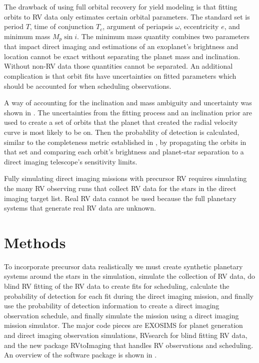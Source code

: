 The drawback of using full orbital recovery for yield modeling is that fitting
orbits to RV data only estimates certain orbital parameters. The standard set
is period $T$, time of conjunction $T_c$, argument of periapsis $\omega$,
eccentricity $e$, and minimum mass $M_p \sin{i}$. The minimum mass quantity
combines two parameters that impact direct imaging and estimations of an
exoplanet's brightness and location cannot be exact without separating the
planet mass and inclination. Without non-RV data those quantities cannot be
separated. An additional complication is that orbit fits have uncertainties on
fitted parameters which should be accounted for when scheduling observations.

A way of accounting for the inclination and mass ambiguity and uncertainty was
shown in . The uncertainties from the fitting
process and an inclination prior are used to create a set of orbits that the
planet that created the radial velocity curve is most likely to be on. Then the
probability of detection is calculated, similar to the completeness metric
established in \citet{Brown2005d}, by propagating the orbits in that set and
comparing each orbit's brightness and planet-star separation to a direct
imaging telescope's sensitivity limits.

Fully simulating direct imaging missions with precursor RV requires simulating
the many RV observing runs that collect RV data for the stars in the direct
imaging target list. Real RV data cannot be used because the full planetary
systems that generate real RV data are unknown.

\section{Methods}
To incorporate precursor data realistically we must create synthetic planetary
systems around the stars in the simulation, simulate the collection of RV data,
do blind RV fitting of the RV data to create fits for scheduling, calculate the
probability of detection for each fit during the direct imaging mission, and
finally use the probability of detection information to create a direct imaging
observation schedule, and finally simulate the mission using a direct imaging
mission simulator. The major code pieces are EXOSIMS for planet generation and
direct imaging observation simulations, RVsearch for blind fitting RV data, and
the new package RVtoImaging that handles RV observations and scheduling. An
overview of the software package is shown in .

